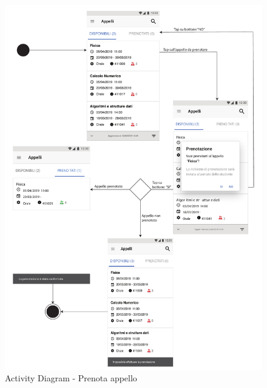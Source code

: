 \begin{figure}
	\centering
	\includegraphics[width=6in]{imgs/gruppo1/activity_diagrams/AD11_prenota_apppello.pdf}
	\caption{Activity Diagram - Prenota appello}
	\label{diag:prenotaAppelloAD}
\end{figure}
\newpage


